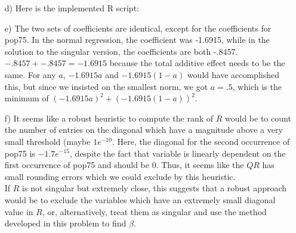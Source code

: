 \documentclass[11pt]{article}
\theoremstyle{definition}
\begin{document}
\begin{itemize}
\begin{itemize}
            \item[d)]
                Here is the implemented R script:
                
            \item[e)]
                The two sets of coefficients are identical, except for the coefficients for pop75. In the normal regression, the coefficient was -1.6915, while in the solution to the singular version, the coefficients are both -.8457. \(-.8457+-.8457=-1.6915\) because the total additive effect needs to be the same. For any $a$, \(-1.6915a\) and \(-1.6915(1-a)\) would have accomplished this, but since we insisted on the smallest norm, we got $a=.5$, which is the minimum of \((-1.6915a)^2+(-1.6915(1-a))^2\).
            \item[f)]
                It seems like a robust heuristic to compute the rank of $R$ would be to count the number of entries on the diagonal which have a magnitude above a very small threshold (maybe $1e^{-10}$. Here, the diagonal for the second occurrence of pop75 is $-1.7e^{-15}$, despite the fact that variable is linearly dependent on the first occurrence of pop75 and should be $0$. Thus, it seems like the $QR$ has small rounding errors which we could exclude by this heuristic. \\
                If $R$ is not singular but extremely close, this suggests that a robust approach would be to exclude the variables which have an extremely small diagonal value in $R$, or, alternatively, treat them as singular and use the method developed in this problem to find $\beta$.
        \end{itemize}
        

\end{itemize}
\end{document}

